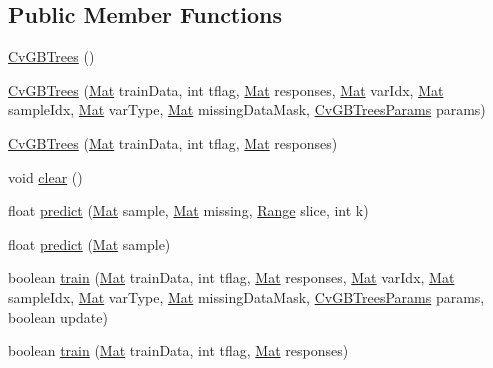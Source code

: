 \subsection*{Public Member Functions}
\begin{DoxyCompactItemize}
\item 
\mbox{\hyperlink{classorg_1_1opencv_1_1ml_1_1_cv_g_b_trees_a167ee377daaa83e7d946ccf21e8a1a54}{Cv\+G\+B\+Trees}} ()
\item 
\mbox{\hyperlink{classorg_1_1opencv_1_1ml_1_1_cv_g_b_trees_acf09cb12799921e5df03a3ce320163c7}{Cv\+G\+B\+Trees}} (\mbox{\hyperlink{classorg_1_1opencv_1_1core_1_1_mat}{Mat}} train\+Data, int tflag, \mbox{\hyperlink{classorg_1_1opencv_1_1core_1_1_mat}{Mat}} responses, \mbox{\hyperlink{classorg_1_1opencv_1_1core_1_1_mat}{Mat}} var\+Idx, \mbox{\hyperlink{classorg_1_1opencv_1_1core_1_1_mat}{Mat}} sample\+Idx, \mbox{\hyperlink{classorg_1_1opencv_1_1core_1_1_mat}{Mat}} var\+Type, \mbox{\hyperlink{classorg_1_1opencv_1_1core_1_1_mat}{Mat}} missing\+Data\+Mask, \mbox{\hyperlink{classorg_1_1opencv_1_1ml_1_1_cv_g_b_trees_params}{Cv\+G\+B\+Trees\+Params}} params)
\item 
\mbox{\hyperlink{classorg_1_1opencv_1_1ml_1_1_cv_g_b_trees_a6ec90d0351c434a29a19fc94e8eaf9f4}{Cv\+G\+B\+Trees}} (\mbox{\hyperlink{classorg_1_1opencv_1_1core_1_1_mat}{Mat}} train\+Data, int tflag, \mbox{\hyperlink{classorg_1_1opencv_1_1core_1_1_mat}{Mat}} responses)
\item 
void \mbox{\hyperlink{classorg_1_1opencv_1_1ml_1_1_cv_g_b_trees_a9327b48fd0132661c3af5c04a198af4f}{clear}} ()
\item 
float \mbox{\hyperlink{classorg_1_1opencv_1_1ml_1_1_cv_g_b_trees_a3311e584ea329ff9193da76e124919c5}{predict}} (\mbox{\hyperlink{classorg_1_1opencv_1_1core_1_1_mat}{Mat}} sample, \mbox{\hyperlink{classorg_1_1opencv_1_1core_1_1_mat}{Mat}} missing, \mbox{\hyperlink{classorg_1_1opencv_1_1core_1_1_range}{Range}} slice, int k)
\item 
float \mbox{\hyperlink{classorg_1_1opencv_1_1ml_1_1_cv_g_b_trees_ad333d70edc4ce626ae759a0b1d445bf7}{predict}} (\mbox{\hyperlink{classorg_1_1opencv_1_1core_1_1_mat}{Mat}} sample)
\item 
boolean \mbox{\hyperlink{classorg_1_1opencv_1_1ml_1_1_cv_g_b_trees_a248cd65534718871f62730e8c8ac142a}{train}} (\mbox{\hyperlink{classorg_1_1opencv_1_1core_1_1_mat}{Mat}} train\+Data, int tflag, \mbox{\hyperlink{classorg_1_1opencv_1_1core_1_1_mat}{Mat}} responses, \mbox{\hyperlink{classorg_1_1opencv_1_1core_1_1_mat}{Mat}} var\+Idx, \mbox{\hyperlink{classorg_1_1opencv_1_1core_1_1_mat}{Mat}} sample\+Idx, \mbox{\hyperlink{classorg_1_1opencv_1_1core_1_1_mat}{Mat}} var\+Type, \mbox{\hyperlink{classorg_1_1opencv_1_1core_1_1_mat}{Mat}} missing\+Data\+Mask, \mbox{\hyperlink{classorg_1_1opencv_1_1ml_1_1_cv_g_b_trees_params}{Cv\+G\+B\+Trees\+Params}} params, boolean update)
\item 
boolean \mbox{\hyperlink{classorg_1_1opencv_1_1ml_1_1_cv_g_b_trees_a0c06240d5ade519aae56c6915671b630}{train}} (\mbox{\hyperlink{classorg_1_1opencv_1_1core_1_1_mat}{Mat}} train\+Data, int tflag, \mbox{\hyperlink{classorg_1_1opencv_1_1core_1_1_mat}{Mat}} responses)
\end{DoxyCompactItemize}
